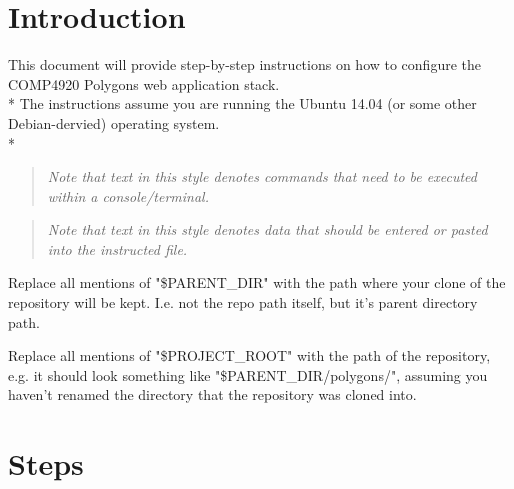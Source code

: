 \documentclass[12pt]{article}
\newenvironment{command}
   { 
      \begin{quote}\itshape
      \color{blue}
   }
   { \end{quote} }
\newenvironment{data}
   { 
      \begin{quote}\itshape
      \color{red}
   }
   { \end{quote} }
\begin{document}
\section{Introduction}
This document will provide step-by-step instructions on how to configure the
COMP4920 Polygons web application stack. \\*
The instructions assume you are running the Ubuntu 14.04 (or some other
Debian-dervied) operating system. \\*

\begin{command} Note that text in this style denotes commands that need to be
executed within a console/terminal. \end{command}

\begin{data} Note that text in this style denotes data that should be entered or
pasted into the instructed file. \end{data}

Replace all mentions of "\$PARENT\_DIR" with the path where your clone of the
repository will be kept. I.e. not the repo path itself, but it's parent
directory path.

Replace all mentions of "\$PROJECT\_ROOT" with the path of the repository, e.g.
it should look something like "\$PARENT\_DIR/polygons/", assuming you haven't
renamed the directory that the repository was cloned into.

\section{Steps}
\end{document}
